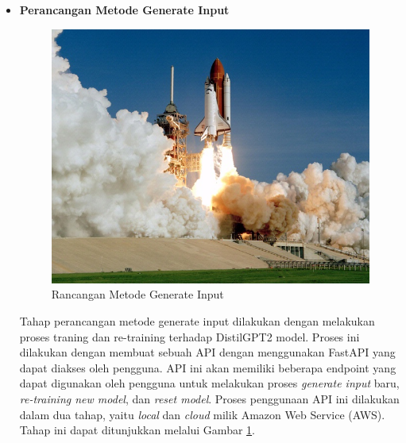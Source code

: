 \begin{itemize}[topsep=0pt]
  \item \textbf{Perancangan Metode Generate Input}
  





  
  \begin{figure}[H]
    \centering
    \includegraphics[scale=0.35]{gambar/roketluarangkasa.jpg}
  
    \caption{Rancangan Metode Generate Input}
    \label{fig:generateinput}

  \end{figure}
  
  Tahap perancangan metode generate input dilakukan dengan 
  melakukan proses traning dan re-training terhadap 
  DistilGPT2 model. Proses ini dilakukan dengan membuat sebuah
  API dengan menggunakan FastAPI yang dapat diakses oleh pengguna. 
  API ini akan memiliki beberapa endpoint yang dapat digunakan 
  oleh pengguna untuk melakukan proses \emph{generate input} baru, 
  \emph{re-training new model}, dan \emph{reset model}. Proses 
  penggunaan API ini dilakukan dalam dua tahap, yaitu \emph{local} 
  dan \emph{cloud} milik Amazon Web Service (AWS).
  Tahap ini dapat ditunjukkan melalui Gambar \ref{fig:generateinput}.


\end{itemize}
